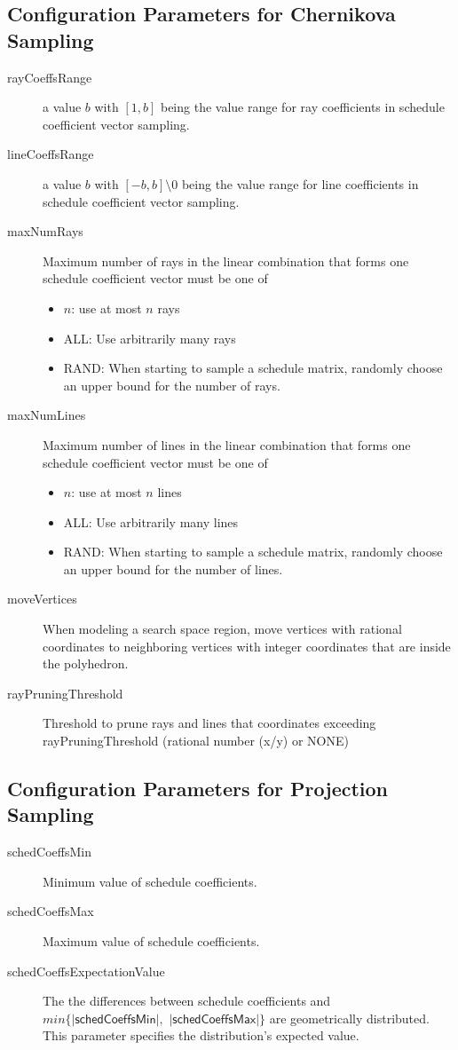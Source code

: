 \documentclass{article}
\begin{document}
\subsection{Configuration Parameters for Chernikova Sampling}
\begin{description}
  \item[rayCoeffsRange] a value $b$ with $[1, b]$ being the value range for
    ray coefficients in schedule coefficient vector sampling.
  \item[lineCoeffsRange] a value $b$ with $[-b, b] \setminus {0}$ being the
    value range for line coefficients in schedule coefficient vector sampling.
  \item[maxNumRays] Maximum number of rays in the linear combination that
    forms one schedule coefficient vector must be one of
    \begin{itemize}
      \item $n$: use at most $n$ rays
      \item ALL: Use arbitrarily many rays
      \item RAND: When starting to sample a schedule matrix, randomly choose
        an upper bound for the number of rays.
    \end{itemize}
  \item[maxNumLines] Maximum number of lines in the linear combination that
    forms one schedule coefficient vector must be one of
    \begin{itemize}
      \item $n$: use at most $n$ lines
      \item ALL: Use arbitrarily many lines
      \item RAND: When starting to sample a schedule matrix, randomly choose
        an upper bound for the number of lines.
    \end{itemize}
  \item[moveVertices] When modeling a search space region, move vertices with
    rational coordinates to neighboring vertices with integer coordinates that
    are inside the polyhedron.
  \item[rayPruningThreshold] Threshold to prune rays and lines that
    coordinates exceeding rayPruningThreshold (rational number (x/y) or NONE)
\end{description}

\subsection{Configuration Parameters for Projection Sampling}
\begin{description}
  \item[schedCoeffsMin] Minimum value of schedule coefficients.
  \item[schedCoeffsMax] Maximum value of schedule coefficients.
  \item[schedCoeffsExpectationValue] The the differences between schedule
    coefficients and $min \lbrace |\textsf{schedCoeffsMin}|,$
    $|\textsf{schedCoeffsMax}| \rbrace$ are geometrically distributed. This
    parameter specifies the distribution's expected value.
\end{description}
\end{document}
